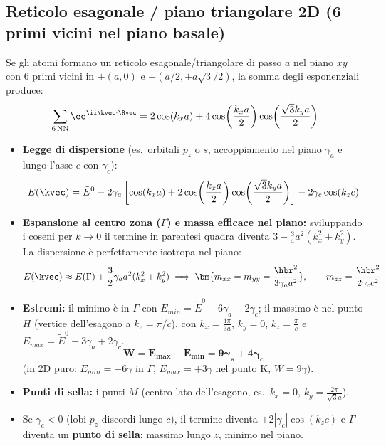 \subsection{Reticolo esagonale / piano triangolare 2D (6 primi vicini nel piano basale)}
Se gli atomi formano un reticolo esagonale/triangolare di passo $a$ nel piano $xy$ con 6 primi vicini in $\pm(a,0)$ e $\pm(a/2,\pm a\sqrt3/2)$, la somma degli esponenziali produce:
\[ \sum_{6\,\text{NN}} \ee^{\ii\kvec\cdot\Rvec} = 2\cos(k_xa) + 4\cos\!\left(\frac{k_xa}{2}\right)\cos\!\left(\frac{\sqrt3 k_ya}{2}\right) \]
\begin{itemize}
    \setlength{\itemsep}{1pt}
    \item \textbf{Legge di dispersione} (es.\ orbitali $p_z$ o $s$, accoppiamento nel piano $\gamma_a$ e lungo l'asse $c$ con $\gamma_c$):
    \[ E(\kvec) = \tilde E^0 - 2\gamma_a\left[\cos(k_xa) + 2\cos\!\left(\frac{k_xa}{2}\right)\cos\!\left(\frac{\sqrt3 k_ya}{2}\right)\right] - 2\gamma_c\cos(k_zc) \]
    \item \textbf{Espansione al centro zona ($\Gamma$) e massa efficace nel piano:} sviluppando i coseni per $k\to0$ il termine in parentesi quadra diventa $3-\frac34 a^2(k_x^2+k_y^2)$. La dispersione è perfettamente isotropa nel piano:
    \[ E(\kvec) \approx E(\Gamma) + \frac{3}{2}\gamma_a a^2(k_x^2+k_y^2)
       \implies \bm{m_{xx}=m_{yy}=\frac{\hbr^2}{3\gamma_a a^2}}, \qquad m_{zz}=\frac{\hbr^2}{2\gamma_c c^2} \]
    \item \textbf{Estremi:} il minimo è in $\Gamma$ con $E_{min}=\tilde E^0-6\gamma_a-2\gamma_c$; il massimo è nel punto $H$ (vertice dell'esagono a $k_z=\pi/c$), con $k_x = \frac{4\pi}{3a},\,k_y=0,\,k_z=\frac{\pi}{c}$ e $E_{max}=\tilde E^0+3\gamma_a+2\gamma_c$.
    \[ \bm{W = E_{max}-E_{min} = 9\gamma_a + 4\gamma_c} \]
    (in 2D puro: $E_{min}=-6\gamma$ in $\Gamma$, $E_{max}=+3\gamma$ nel punto K, $W=9\gamma$).
    \item \textbf{Punti di sella:} i punti $M$ (centro-lato dell'esagono, es.\ $k_x=0,\,k_y=\frac{2\pi}{\sqrt3 a}$).
    \item Se $\gamma_c<0$ (lobi $p_z$ discordi lungo $c$), il termine diventa $+2|\gamma_c|\cos(k_zc)$ e $\Gamma$ diventa un \textbf{punto di sella}: massimo lungo $z$, minimo nel piano.
\end{itemize}

